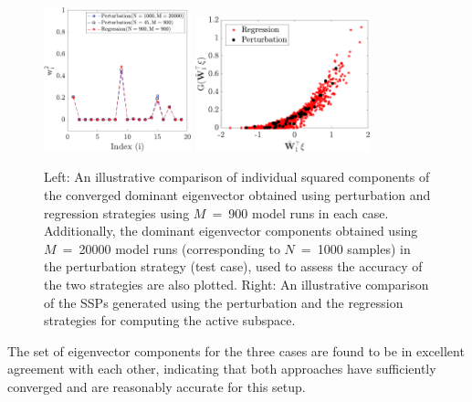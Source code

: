 %
\begin{figure}[htbp]
 \begin{center}
  \includegraphics[width=0.38\textwidth]{eig_conv19D}
  \includegraphics[width=0.45\textwidth]{comp_ssp19D}
\caption{Left: An illustrative comparison of individual squared components of the converged dominant
eigenvector obtained using perturbation and regression strategies using $M$~=~900 model runs in each case. 
Additionally, the dominant eigenvector components obtained using $M$~=~20000 model runs (corresponding to 
$N$~=~1000 samples)
in the perturbation strategy (test case), used to assess the accuracy of the two strategies are also plotted.
Right: An illustrative comparison of the SSPs generated using the
perturbation and the regression strategies for computing the active subspace. 
}
\label{fig:comp}
\end{center}
\end{figure}
%
The set of eigenvector components for the three cases are found to be in excellent agreement with
each other, indicating that both
approaches have sufficiently converged and are reasonably accurate for this setup.

